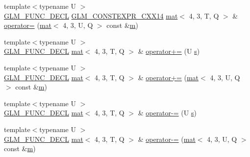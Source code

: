 \begin{DoxyCompactItemize}
\item 
{\footnotesize template$<$typename U $>$ }\\\mbox{\hyperlink{setup_8hpp_ab2d052de21a70539923e9bcbf6e83a51}{G\+L\+M\+\_\+\+F\+U\+N\+C\+\_\+\+D\+E\+CL}} \mbox{\hyperlink{setup_8hpp_a4dd12abf5e1164bc57f3a34671d03844}{G\+L\+M\+\_\+\+C\+O\+N\+S\+T\+E\+X\+P\+R\+\_\+\+C\+X\+X14}} \mbox{\hyperlink{structglm_1_1mat}{mat}}$<$ 4, 3, T, Q $>$ \& \mbox{\hyperlink{structglm_1_1mat_3_014_00_013_00_01_t_00_01_q_01_4_a82d2202eb9fed8f650e228affae47ba7}{operator=}} (\mbox{\hyperlink{structglm_1_1mat}{mat}}$<$ 4, 3, U, Q $>$ const \&\mbox{\hyperlink{_s_d_l__opengl__glext_8h_af593500c283bf1a787a6f947f503a5c2}{m}})
\item 
{\footnotesize template$<$typename U $>$ }\\\mbox{\hyperlink{setup_8hpp_ab2d052de21a70539923e9bcbf6e83a51}{G\+L\+M\+\_\+\+F\+U\+N\+C\+\_\+\+D\+E\+CL}} \mbox{\hyperlink{structglm_1_1mat}{mat}}$<$ 4, 3, T, Q $>$ \& \mbox{\hyperlink{structglm_1_1mat_3_014_00_013_00_01_t_00_01_q_01_4_afd8c591747fffe69889f28170bf76294}{operator+=}} (U \mbox{\hyperlink{_s_d_l__opengl_8h_a4af680a6c683f88ed67b76f207f2e6e4}{s}})
\item 
{\footnotesize template$<$typename U $>$ }\\\mbox{\hyperlink{setup_8hpp_ab2d052de21a70539923e9bcbf6e83a51}{G\+L\+M\+\_\+\+F\+U\+N\+C\+\_\+\+D\+E\+CL}} \mbox{\hyperlink{structglm_1_1mat}{mat}}$<$ 4, 3, T, Q $>$ \& \mbox{\hyperlink{structglm_1_1mat_3_014_00_013_00_01_t_00_01_q_01_4_aa7b86eac813820bbca325d7ac853e612}{operator+=}} (\mbox{\hyperlink{structglm_1_1mat}{mat}}$<$ 4, 3, U, Q $>$ const \&\mbox{\hyperlink{_s_d_l__opengl__glext_8h_af593500c283bf1a787a6f947f503a5c2}{m}})
\item 
{\footnotesize template$<$typename U $>$ }\\\mbox{\hyperlink{setup_8hpp_ab2d052de21a70539923e9bcbf6e83a51}{G\+L\+M\+\_\+\+F\+U\+N\+C\+\_\+\+D\+E\+CL}} \mbox{\hyperlink{structglm_1_1mat}{mat}}$<$ 4, 3, T, Q $>$ \& \mbox{\hyperlink{structglm_1_1mat_3_014_00_013_00_01_t_00_01_q_01_4_a88092ec48acadaf5147db1f4d9fdd964}{operator-\/=}} (U \mbox{\hyperlink{_s_d_l__opengl_8h_a4af680a6c683f88ed67b76f207f2e6e4}{s}})
\item 
{\footnotesize template$<$typename U $>$ }\\\mbox{\hyperlink{setup_8hpp_ab2d052de21a70539923e9bcbf6e83a51}{G\+L\+M\+\_\+\+F\+U\+N\+C\+\_\+\+D\+E\+CL}} \mbox{\hyperlink{structglm_1_1mat}{mat}}$<$ 4, 3, T, Q $>$ \& \mbox{\hyperlink{structglm_1_1mat_3_014_00_013_00_01_t_00_01_q_01_4_aafef14a762200cd1cbba9abb1d366d75}{operator-\/=}} (\mbox{\hyperlink{structglm_1_1mat}{mat}}$<$ 4, 3, U, Q $>$ const \&\mbox{\hyperlink{_s_d_l__opengl__glext_8h_af593500c283bf1a787a6f947f503a5c2}{m}})

\end{DoxyCompactItemize}
